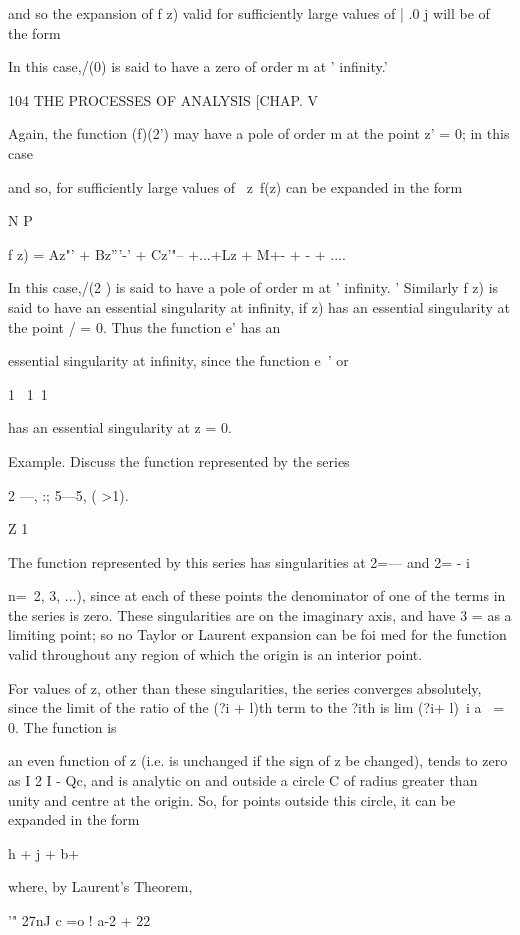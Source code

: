 {{{{and so the expansion of f z) valid for sufficiently large values of |
.0 j will be of the form

In this case,/(0) is said to have a zero of order m at ' infinity.'

104 THE PROCESSES OF ANALYSIS [CHAP. V

Again, the function (f)(2') may have a pole of order m at the point z'
= 0; in this case

and so, for sufficiently large values of \ z\, f(z) can be expanded in
the form

N P

f z) = Az"' + Bz'''-' + Cz'"-- +...+Lz + M+- + - + ....

In this case,/(2 ) is said to have a pole of order m at ' infinity. '
Similarly f z) is said to have an essential singularity at infinity,
if z) has an essential singularity at the point / = 0. Thus the
function e' has an

essential singularity at infinity, since the function e~' or

1 \ 1\ 1

has an essential singularity at z = 0.

Example. Discuss the function represented by the series

2 —, :; 5—5, ( >1).

Z 1

The function represented by this series has singularities at 2=— and
2= - i

 n=\, 2, 3, ...), since at each of these points the denominator of one
of the terms in the series is zero. These singularities are on the
imaginary axis, and have 3 = as a limiting point; so no Taylor or
Laurent expansion can be foi med for the function valid throughout any
region of which the origin is an interior point.

For values of z, other than these singularities, the series converges
absolutely, since the limit of the ratio of the (?i + l)th term to the
?ith is lim (?i+ l)~i a~ = 0. The function is

an even function of z (i.e. is unchanged if the sign of z be changed),
tends to zero as I 2 I - Qc, and is analytic on and outside a circle
C of radius greater than unity and centre at the origin. So, for
points outside this circle, it can be expanded in the form

h + j + b+

where, by Laurent's Theorem,

'" 27nJ c =o ! a-2 + 22

}}}}
